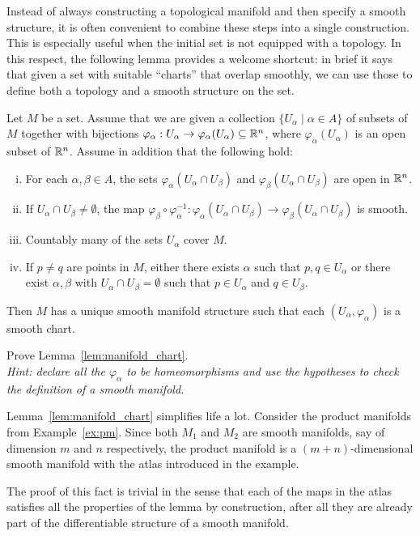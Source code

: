 Instead of always constructing a topological manifold and then specify a smooth structure, it is often convenient to combine these steps into a single construction.
This is especially useful when the initial set is not equipped with a topology.
In this respect, the following lemma provides a welcome shortcut: in brief it says that given a set with suitable ``charts'' that overlap smoothly, we can use those to define both a topology and a smooth structure on the set.

\begin{lemma}\label{lem:manifold_chart}
	Let $M$ be a set. Assume that we are given a collection $\{U_\alpha\mid \alpha\in A\}$ of subsets of $M$ together with bijections $\varphi_\alpha: U_\alpha\to\varphi_\alpha(U_\alpha)\subseteq\mathbb{R}^n$, where $\varphi_\alpha(U_\alpha)$ is an open subset of $\mathbb{R}^n$. Assume in addition that the following hold:
	\begin{enumerate}[(i)]
		\item For each $\alpha, \beta \in A$, the sets $\varphi_\alpha(U_\alpha \cap U_\beta)$ and $\varphi_\beta(U_\alpha \cap U_\beta)$ are open in $\mathbb{R}^n$.
		\item If $U_\alpha \cap U_\beta \neq \emptyset$, the map $\varphi_\beta\circ\varphi_\alpha^{-1}: \varphi_\alpha(U_\alpha \cap U_\beta)\to \varphi_\beta(U_\alpha \cap U_\beta)$ is smooth.
		\item Countably many of the sets $U_\alpha$ cover $M$.
		\item If $p\neq q$ are points in $M$, either there exists $\alpha$ such that $p,q\in U_\alpha$ or there exist $\alpha,\beta$ with $U_\alpha\cap U_\beta=\emptyset$ such that $p\in U_\alpha$ and $q\in U_\beta$.
	\end{enumerate}
	Then $M$ has a unique smooth manifold structure such that each $(U_\alpha,\varphi_\alpha)$ is a smooth chart.
\end{lemma}
\begin{exercise}
	Prove Lemma~\ref{lem:manifold_chart}.\\
	\textit{\small Hint: declare all the $\varphi_\alpha$ to be homeomorphisms and use the hypotheses to check the definition of a smooth manifold.}
\end{exercise}

\begin{example}
	Lemma~\ref{lem:manifold_chart} simplifies life a lot.
	Consider the product manifolds from Example~\ref{ex:pm}.
	Since both $M_1$ and $M_2$ are smooth manifolds, say of dimension $m$ and $n$ respectively, the product manifold is a $(m+n)$-dimensional smooth manifold with the atlas introduced in the example.

	The proof of this fact is trivial in the sense that each of the maps in the atlas satisfies all the properties of the lemma by construction, after all they are already part of the differentiable structure of a smooth manifold.
\end{example}

